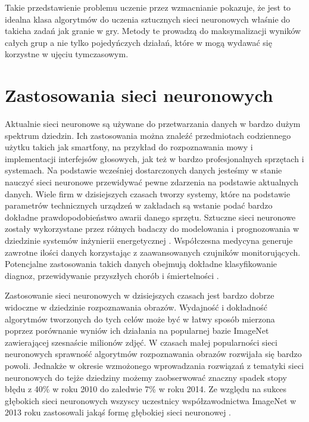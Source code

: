 \documentclass[12pt, oneside, a4paper]{report}
\begin{document}
Takie przedstawienie problemu uczenie przez wzmacnianie pokazuje, że jest to idealna klasa algorytmów do uczenia sztucznych sieci neuronowych właśnie do takicha zadań jak granie w gry. Metody te prowadzą do maksymalizacji wyników całych grup a nie tylko pojedyńczych działań, które w mogą wydawać się korzystne w ujęciu tymczasowym.

\section{Zastosowania sieci neuronowych}

Aktualnie sieci neuronowe są używane do przetwarzania danych w bardzo dużym spektrum dziedzin. Ich zastosowania można znaleźć przedmiotach codziennego użytku takich jak smartfony, na przykład do rozpoznawania mowy i implementacji interfejsów głosowych, jak też w bardzo profesjonalnych sprzętach i systemach. Na podstawie wcześniej dostarczonych danych jesteśmy w stanie nauczyć sieci neuronowe przewidywać pewne zdarzenia na podstawie aktualnych danych. Wiele firm w dzisiejszych czasach tworzy systemy, które na podstawie parametrów technicznych urządzeń w zakładach są wstanie podać bardzo dokładne prawdopodobieństwo awarii danego sprzętu. Sztuczne sieci neuronowe zostały wykorzystane przez różnych badaczy do modelowania i prognozowania w dziedzinie systemów inżynierii energetycznej \citep{kalogirou2000applications}. Współczesna medycyna generuje zawrotne ilości danych korzystając z zaawansowanych czujników monitorujących. Potencjalne zastosowania takich danych obejmują dokładne klasyfikowanie diagnoz, przewidywanie przyszłych chorób i śmiertelności \citep{lipton2015learning}.

Zastosowanie sieci neuronowych w dzisiejszych czasach jest bardzo dobrze widoczne w dziedzinie rozpoznawania obrazów. Wydajność i dokładność algorytmów tworzonych do tych celów może być w łatwy sposób mierzona poprzez porównanie wyniów ich działania na popularnej bazie ImageNet \citep{image-net} zawierającej szesnaście milionów zdjęć. W czasach małej popularności sieci neuronowych sprawność algorytmów rozpoznawania obrazów rozwijała się bardzo powoli. Jednakże w okresie wzmożonego wprowadzania rozwiązań z tematyki sieci neuronowych do tejże dziedziny możemy zaobserwować znaczny spadek stopy błędu z 40\% w roku 2010 do zaledwie 7\% w roku 2014. Ze względu na sukces głębokich sieci neuronowych wszyscy uczestnicy współzawodnictwa ImageNet w 2013 roku zastosowali jakąś formę głębokiej sieci neuronowej \citep{roelants2017deeplearning}.
\end{document}
